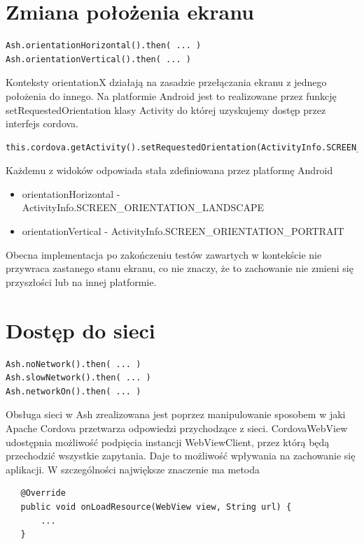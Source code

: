 \documentclass[brudnopis]{xmgr}
\begin{document}
\section{Zmiana położenia ekranu}

\begin{lstlisting}
Ash.orientationHorizontal().then( ... ) 
Ash.orientationVertical().then( ... ) 
\end{lstlisting}

Konteksty orientationX działają na zasadzie przełączania ekranu z jednego położenia do innego.  Na platformie Android jest to realizowane przez funkcję setRequestedOrientation klasy Activity do której uzyskujemy dostęp przez interfejs cordova. 

\begin{lstlisting}
this.cordova.getActivity().setRequestedOrientation(ActivityInfo.SCREEN_ORIENTATION_LANDSCAPE);
\end{lstlisting}

Każdemu z widoków odpowiada stała zdefiniowana przez platformę Android
\begin{itemize}
  \item orientationHorizontal - ActivityInfo.SCREEN\_ORIENTATION\_LANDSCAPE
  \item orientationVertical - ActivityInfo.SCREEN\_ORIENTATION\_PORTRAIT
\end{itemize}

Obecna implementacja po zakończeniu testów zawartych w kontekście nie przywraca zastanego stanu ekranu, co nie znaczy, że to zachowanie nie zmieni się przyszłości lub na innej platformie.

\section{Dostęp do sieci}

\begin{lstlisting}
Ash.noNetwork().then( ... ) 
Ash.slowNetwork().then( ... ) 
Ash.networkOn().then( ... ) 
\end{lstlisting}

Obsługa sieci w Ash zrealizowana jest poprzez manipulowanie sposobem w jaki Apache Cordova przetwarza odpowiedzi przychodzące z sieci. CordovaWebView udostępnia możliwość podpięcia instancji WebViewClient, przez którą będą przechodzić wszystkie zapytania. Daje to możliwość wpływania na zachowanie się aplikacji. W szczególności największe znaczenie ma metoda

\begin{lstlisting}
   @Override
   public void onLoadResource(WebView view, String url) {
       ...
   }
\end{lstlisting}
\end{document}
